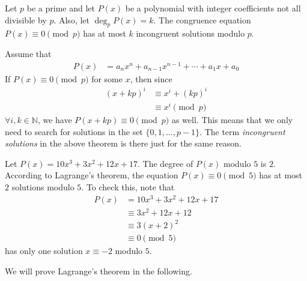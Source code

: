 	\begin{theorem}\label{thm:lagrange}
		Let $p$ be a prime and let $P(x)$ be a polynomial with integer coefficients not all divisible by $p$. Also, let $\deg_p P(x) = k$. The congruence equation $P(x)\equiv0\pmod p$ has at most $k$ incongruent solutions modulo $p$.
	\end{theorem}

	\begin{note}
		Assume that
			\begin{align*}
				P(x)
					& =a_nx^n + a_{n-1}x^{n-1} + \cdots + a_1 x +a_0
			\end{align*}
		If $P(x) \equiv 0 \pmod p$ for some $x$, then since
			\begin{align*}
				(x+kp)^i
					& \equiv x^i + (kp)^i\\
					& \equiv x^i \pmod p
			\end{align*}
		$\forall i,k \in \mathbb N$, we have $P(x+kp) \equiv 0 \pmod p$ as well. This means that we only need to search for solutions in the set $\{0, 1, \ldots, p-1\}$. The term \textit{incongruent solutions} in the above theorem is there just for the same reason.
	\end{note}


	\begin{example}
		Let $P(x)=10x^3+3x^2 + 12x+17$.  The degree of $P(x)$ modulo $5$ is $2$. According to Lagrange's theorem, the equation $P(x) \equiv 0 \pmod 5$ has at most $2$ solutions modulo $5$. To check this, note that
			\begin{align*}
				P(x)
					& = 10x^3+3x^2 + 12x+17\\
					& \equiv 3x^2 + 12x+12\\
					& \equiv 3(x+2)^2\\
					& \equiv 0 \pmod 5
			\end{align*}
		has only one solution $x \equiv -2$ modulo $5$.
	\end{example}

We will prove Lagrange's theorem in the following.

